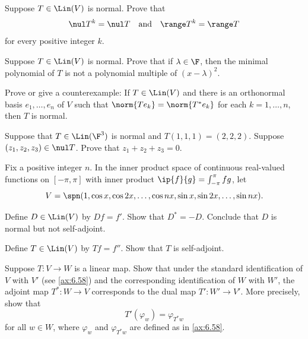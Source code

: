 \begin{exercise}
Suppose $T\in\Lin(V)$ is normal. Prove that
\[ \nul T^k=\nul T \quad\text{and}\quad \range T^k=\range T \]
for every positive integer $k$.
\end{exercise}

\begin{exercise}
Suppose $T\in\Lin(V)$ is normal. Prove that if $\lambda\in\F$, then the minimal
polynomial of $T$ is not a polynomial multiple of $(x-\lambda)^2$.
\end{exercise}

\begin{exercise}
Prove or give a counterexample: If $T\in\Lin(V)$ and there is an orthonormal
basis $e_1,\dots,e_n$ of $V$ such that $\norm{Te_k}=\norm{T^*e_k}$ for each
$k=1,\dots,n$, then $T$ is normal.
\end{exercise}

\begin{exercise}
Suppose that $T\in\Lin(\F^3)$ is normal and $T(1,1,1)=(2,2,2)$. Suppose
$(z_1,z_2,z_3)\in\nul T$. Prove that $z_1+z_2+z_3=0$.
\end{exercise}

\begin{exercise}
Fix a positive integer $n$. In the inner product space of continuous
real-valued functions on $[-\pi,\pi]$ with inner product
$\ip{f}{g}=\int_{-\pi}^{\pi}fg$, let
\[ V = \spn(1,\cos x,\cos2x,\dots,\cos nx,\sin x,\sin2x,\dots,\sin nx). \]
\begin{parts}
\item Define $D\in\Lin(V)$ by $Df=f'$. Show that $D^*=-D$. Conclude that $D$ is
  normal but not self-adjoint.
\item Define $T\in\Lin(V)$ by $Tf=f''$. Show that $T$ is self-adjoint.
\end{parts}
\end{exercise}

\begin{exercise}
Suppose $T\colon V\to W$ is a linear map. Show that under the standard
identification of $V$ with $V'$ (see \ref{ax:6.58}) and the corresponding
identification of $W$ with $W'$, the adjoint map $T^*\colon W\to V$ corresponds
to the dual map $T'\colon W'\to V'$. More precisely, show that
\[ T'(\varphi_w) = \varphi_{T^*w} \]
for all $w\in W$, where $\varphi_w$ and $\varphi_{T^*w}$ are defined as in
\ref{ax:6.58}.
\end{exercise}
